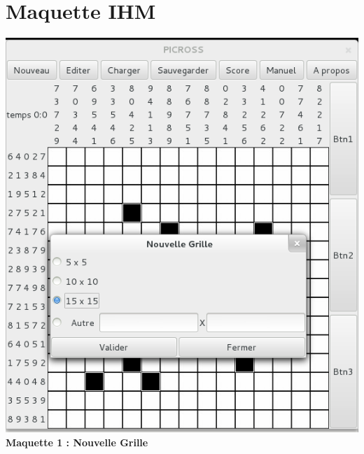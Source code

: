 \chapter{Maquette IHM}


\begin{center}
                \includegraphics[scale=0.6]{data/screenMaquette/NouvelleGrille.png}\\
                \textbf{Maquette 1 : Nouvelle Grille}
\end{center}

